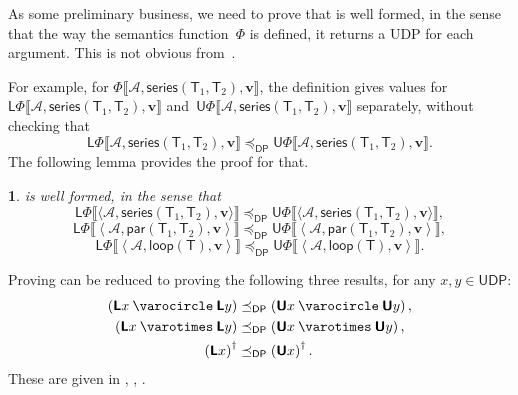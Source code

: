 \documentclass[twocolumn,english]{IEEEconf}
\theoremstyle{plain}
\theoremstyle{definition}
\theoremstyle{definition}
\theoremstyle{plain}
\newtheorem{lem}[thm]{\protect\lemmaname}
\newcommand{\aword}[1]{\mathsf{#1}}
\newcommand{\vmath}[1]{\aword{#1}}
\newcommand{\posleq}{\preceq}
\newcommand{\dpseries}{\vmath{series}}
\newcommand{\dppar}{\vmath{par}}
\newcommand{\dploop}{\vmath{loop}}
\newcommand{\udpL}{\boldsymbol{\mathsf{L}}}
\newcommand{\udpU}{\boldsymbol{\mathsf{U}}}
\newcommand{\udpsp}{\vmath{UDP}}
\newcommand{\dpsp}{\vmath{DP}}
\newcommand{\dpleq}{\posleq_\dpsp}
\newcommand{\udpsem}{\Phi}
\newcommand{\atoms}{\mathcal{A}}
\newcommand{\atree}{\boldsymbol{\vmath{T}}}
\newcommand{\val}{\boldsymbol{v}}
\newcommand{\oploop}{\dagger}
\newcommand{\opseries}{\mathbin{\varocircle}}
\newcommand{\oppar}{\mathbin{\varotimes}}
\providecommand{\lemmaname}{Lemma}
\begin{document}
As some preliminary business, we need to prove that 
is well formed, in the sense that the way the semantics function~$\udpsem$
is defined, it returns a UDP for each argument. This is not obvious
from~. 

For example, for $\udpsem\llbracket\atoms,\dpseries(\atree_{1},\atree_{2}),\val\rrbracket$,
the definition gives values for~$\udpL\udpsem\llbracket\atoms,\dpseries(\atree_{1},\atree_{2}),\val\rrbracket$
and~$\udpU\udpsem\llbracket\atoms,\dpseries(\atree_{1},\atree_{2}),\val\rrbracket$
separately, without checking that 
\[
\udpL\udpsem\llbracket\atoms,\dpseries(\atree_{1},\atree_{2}),\val\rrbracket\dpleq\udpU\udpsem\llbracket\atoms,\dpseries(\atree_{1},\atree_{2}),\val\rrbracket.
\]
 The following lemma provides the proof for that.
\begin{lem}
\label{lem:udpsem-well-formed} is well
formed, in the sense that {\small{}
\begin{equation}
\udpL\udpsem\llbracket\langle\atoms,\dpseries(\atree_{1},\atree_{2}),\val\rangle\rrbracket\dpleq\udpU\udpsem\llbracket\langle\atoms,\dpseries(\atree_{1},\atree_{2}),\val\rangle\rrbracket,\label{eq:wf1}
\end{equation}
\begin{equation}
\udpL\udpsem\llbracket\left\langle \atoms,\dppar(\atree_{1},\atree_{2}),\val\right\rangle \rrbracket\dpleq\udpU\udpsem\llbracket\left\langle \atoms,\dppar(\atree_{1},\atree_{2}),\val\right\rangle \rrbracket,\label{eq:wf2}
\end{equation}
\begin{equation}
\udpL\udpsem\llbracket\left\langle \atoms,\dploop(\atree),\val\right\rangle \rrbracket\dpleq\udpU\udpsem\llbracket\left\langle \atoms,\dploop(\atree),\val\right\rangle \rrbracket.\label{eq:wf3}
\end{equation}
}{\small \par}
\end{lem}
\begin{IEEEproof}
Proving \textemdash {} can be
reduced to proving the following three results, for any $x,y\in\udpsp$:
\begin{align*}
\left(\udpL x\opseries\udpL y\right) & \dpleq\left(\udpU x\opseries\udpU y\right),\\
\left(\udpL x\oppar\udpL y\right) & \dpleq\left(\udpU x\oppar\udpU y\right),\\
\left(\udpL x\right)^{\oploop} & \dpleq\left(\udpU x\right)^{\oploop}.
\end{align*}
These are given in , ,
.
\end{IEEEproof}
\end{document}
